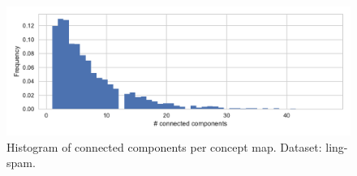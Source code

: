 \begin{figure}[h]
\centering
\includegraphics[width=0.8\linewidth]{assets/figures/hist-connected-components-ling-spam-CMap.pdf}
\caption{Histogram of connected components per concept map. Dataset: ling-spam.}
\end{figure}



